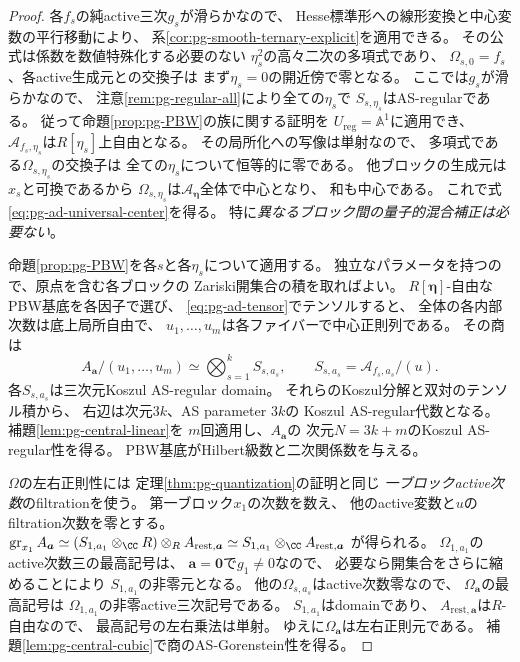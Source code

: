 \begin{proof}
各$f_s$の純active三次$g_s$が滑らかなので、
Hesse標準形への線形変換と中心変数の平行移動により、
系\ref{cor:pg-smooth-ternary-explicit}を適用できる。
その公式は係数を数値特殊化する必要のない
$\eta_s^2$の高々二次の多項式であり、
$\Omega_{s,0}=f_s$、各active生成元との交換子は
まず$\eta_s=0$の開近傍で零となる。
ここでは$g_s$が滑らかなので、
注意\ref{rem:pg-regular-all}により全ての$\eta_s$で
$S_{s,\eta_s}$はAS-regularである。
従って命題\ref{prop:pg-PBW}の族に関する証明を
$U_{\mathrm{reg}}=\mathbb A^1$に適用でき、
$\mathcal A_{f_s,\eta_s}$は$R[\eta_s]$上自由となる。
その局所化への写像は単射なので、
多項式である$\Omega_{s,\eta_s}$の交換子は
全ての$\eta_s$について恒等的に零である。
他ブロックの生成元は$x_s$と可換であるから
$\Omega_{s,\eta_s}$は$\mathcal A_{\boldsymbol\eta}$全体で中心となり、
和も中心である。
これで式\eqref{eq:pg-ad-universal-center}を得る。
特に\emph{異なるブロック間の量子的混合補正は必要ない}。

命題\ref{prop:pg-PBW}を各$s$と各$\eta_s$について適用する。
独立なパラメータを持つので、原点を含む各ブロックの
Zariski開集合の積を取ればよい。
$R[\boldsymbol\eta]$-自由なPBW基底を各因子で選び、
\eqref{eq:pg-ad-tensor}でテンソルすると、
全体の各内部次数は底上局所自由で、
$u_1,\ldots,u_m$は各ファイバーで中心正則列である。
その商は
\begin{equation}
 A_{\boldsymbol a}/(u_1,\ldots,u_m)
 \simeq\bigotimes_{s=1}^k
  S_{s,a_s},\qquad
 S_{s,a_s}=\mathcal A_{f_s,a_s}/(u).
\end{equation}
各$S_{s,a_s}$は三次元Koszul AS-regular domain。
それらのKoszul分解と双対のテンソル積から、
右辺は次元$3k$、AS parameter $3k$の
Koszul AS-regular代数となる。
補題\ref{lem:pg-central-linear}を
$m$回適用し、$A_{\boldsymbol a}$の
次元$N=3k+m$のKoszul AS-regular性を得る。
PBW基底がHilbert級数と二次関係数を与える。

$\Omega$の左右正則性には
定理\ref{thm:pg-quantization}の証明と同じ
\emph{一ブロックactive次数}のfiltrationを使う。
第一ブロック$x_1$の次数を数え、
他のactive変数と$u$のfiltration次数を零とする。
$\operatorname{gr}_{x_1}A_{\boldsymbol a}
\simeq
 (S_{1,a_1}\otimes_\CC R)
 \otimes_R A_{\mathrm{rest},\boldsymbol a}
 \simeq S_{1,a_1}\otimes_\CC A_{\mathrm{rest},\boldsymbol a}$
が得られる。
$\Omega_{1,a_1}$のactive次数三の最高記号は、
$\boldsymbol a=\boldsymbol0$で$g_1\ne0$なので、
必要なら開集合をさらに縮めることにより
$S_{1,a_1}$の非零元となる。
他の$\Omega_{s,a_s}$はactive次数零なので、
$\Omega_{\boldsymbol a}$の最高記号は
$\Omega_{1,a_1}$の非零active三次記号である。
$S_{1,a_1}$はdomainであり、
$A_{\mathrm{rest},\boldsymbol a}$は$R$-自由なので、
最高記号の左右乗法は単射。
ゆえに$\Omega_{\boldsymbol a}$は左右正則元である。
補題\ref{lem:pg-central-cubic}で商のAS-Gorenstein性を得る。


\end{proof}
